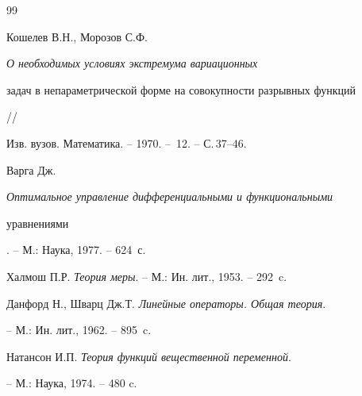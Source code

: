 \begin{thebibliography}{99}


Кошелев В.Н., Морозов С.Ф. {\em О необходимых условиях экстремума вариационных


задач в непараметрической форме на совокупности разрывных функций} //


Изв. вузов. Математика. -- 1970. -- \No\,12. -- С.\,37--46.




Варга Дж. {\em Оптимальное управление дифференциальными и функциональными


уравнениями}. -- М.: Наука, 1977. -- 624~с.




Халмош П.Р. {\em Теория меры}. -- М.: Ин. лит., 1953. -- 292~c.




Данфорд Н., Шварц Дж.Т. {\em Линейные операторы. Общая теория}.


-- М.: Ин. лит., 1962. -- 895~c.




Натансон И.П. {\em Теория функций вещественной переменной}.


-- М.: Наука, 1974. -- 480 c.





\end{thebibliography}





\vskip 2cm












\label{end}





